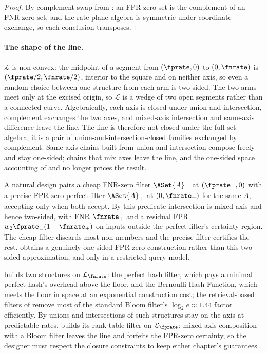 \begin{proof}
By complement-swap from : an FPR-zero set is the
complement of an FNR-zero set, and the rate-plane algebra is symmetric under
coordinate exchange, so each conclusion transposes.
\end{proof}

\paragraph{The shape of the line.}
$\mathcal{L}$ is non-convex: the midpoint of a segment from $(\fprate, 0)$ to
$(0, \fnrate)$ is $(\fprate/2, \fnrate/2)$, interior to the square and on
neither axis, so even a random choice between one structure from each arm is
two-sided. The two arms meet only at the excised origin, so $\mathcal{L}$ is
a wedge of two open segments rather than a connected curve. Algebraically,
each axis is closed under union and intersection, complement exchanges the
two axes, and mixed-axis intersection and same-axis difference leave the
line. The line is therefore not closed under the full set algebra; it is a
pair of union-and-intersection-closed families exchanged by complement.
Same-axis chains built from union and intersection compose freely and stay
one-sided; chains that mix axes leave the line, and the one-sided space
accounting of  and
 no longer prices the result.

\begin{remark}
\label{rem:two-pass}
A natural design pairs a cheap FNR-zero filter $\ASet{A}_-$ at $(\fprate_-,
0)$ with a precise FPR-zero perfect filter $\ASet{A}_+$ at $(0, \fnrate_+)$
for the same $A$, accepting only when both accept. By
 this predicate-intersection is
mixed-axis and hence two-sided, with FNR $\fnrate_+$ and a residual FPR
$w_2 \fprate_-(1 - \fnrate_+)$ on inputs outside the perfect filter's
certainty region. The cheap filter discards most non-members and the precise
filter certifies the rest.  obtains a
genuinely one-sided FPR-zero construction rather than this two-sided
approximation, and only in a restricted query model.
\end{remark}

 builds two structures on
$\mathcal{L}_{\fnrate}$: the perfect hash filter, which pays a minimal
perfect hash's overhead above the floor, and the Bernoulli Hash Function,
which meets the floor in space at an exponential construction cost; the
retrieval-based filters of  remove most of the standard
Bloom filter's $\log_2 e \approx 1.44$ factor efficiently. By
 unions and intersections of such structures stay
on the axis at predictable rates.
 builds its rank-table filter on
$\mathcal{L}_{\fprate}$; mixed-axis composition with a Bloom filter leaves the
line and forfeits the FPR-zero certainty, so the designer must respect the
closure constraints to keep either chapter's guarantees.
